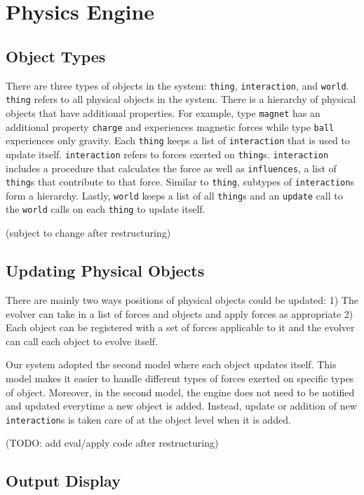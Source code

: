 \documentclass{article}
\begin{document}
\section{Physics Engine}
\subsection{Object Types}

There are three types of objects in the system: \texttt{thing},
\texttt{interaction}, and \texttt{world}. \texttt{thing} refers to all physical
objects in the system. There is a hierarchy of physical objects that have
additional properties. For example, type \texttt{magnet} has an additional
property \texttt{charge} and experiences magnetic forces while type
\texttt{ball} experiences only gravity. Each \texttt{thing} keeps a list of
\texttt{interaction} that is used to update itself. \texttt{interaction} refers
to forces exerted on \texttt{thing}s. \texttt{interaction} includes a procedure
that calculates the force as well as \texttt{influences}, a list of
\texttt{thing}s that contribute to that force. Similar to \texttt{thing},
subtypes of \texttt{interaction}s form a hierarchy. Lastly, \texttt{world}
keeps a list of all \texttt{thing}s and an \texttt{update} call to the
\texttt{world} calls on each \texttt{thing} to update itself.

(subject to change after restructuring)

\subsection{Updating Physical Objects}

There are mainly two ways positions of physical objects could be updated: 1)
The evolver can take in a list of forces and objects and apply forces as
appropriate 2) Each object can be registered with a set of forces applicable to
it and the evolver can call each object to evolve itself.

Our system adopted the second model where each object updates itself. This
model makes it easier to handle different types of forces exerted on specific
types of object. Moreover, in the second model, the engine does not need to be
notified and updated everytime a new object is added. Instead, update or
addition of new \texttt{interaction}s is taken care of at the object level when
it is added.

(TODO: add eval/apply code after restructuring)

\subsection{Output Display}
\end{document}
